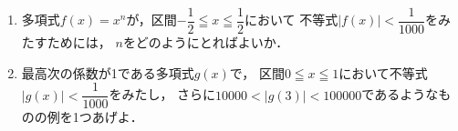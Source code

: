 \documentclass[../../main.tex]{subfiles}
\begin{document}
\begin{enumerate}
  \item 多項式$f(x)=x^n$が，区間$\displaystyle -\dfrac{1}{2} \leqq x \leqq \dfrac{1}{2}$において
    不等式$\displaystyle |f(x)|<\dfrac{1}{1000}$をみたすためには，
    $n$をどのようにとればよいか．
  \item 最高次の係数が1である多項式$g(x)$で，
    区間$0 \leqq x \leqq 1$において不等式$\displaystyle|g(x)|<\dfrac{1}{1000}$をみたし，
    さらに$10000<|g(3)|<100000$であるようなものの例を1つあげよ．
\end{enumerate}
\end{document}

